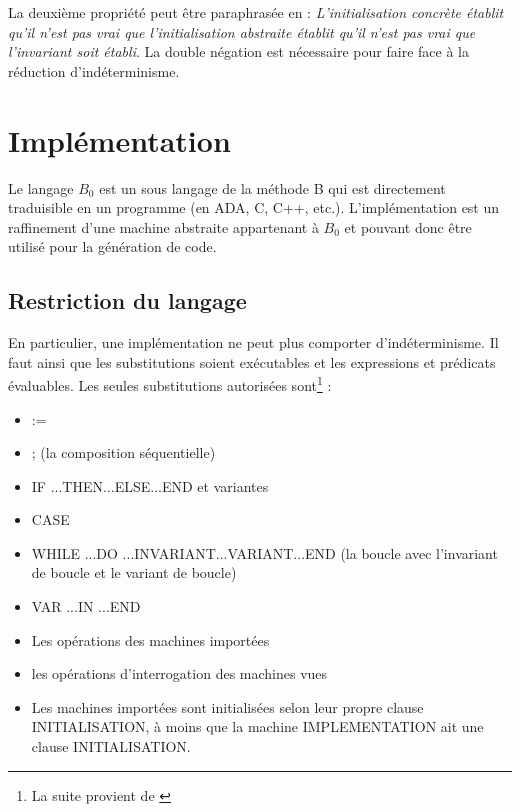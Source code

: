 \documentclass[10pt,a4paper]{article}
\begin{document}
{La deuxième propriété peut être paraphrasée en : \emph{L'initialisation concrète établit qu'il n'est pas vrai que l'initialisation abstraite établit qu'il n'est pas vrai que l'invariant soit établi}\cite{habrias2006specifications}. La double négation est nécessaire pour faire face à la réduction d'indéterminisme.
\section{Implémentation}

Le langage $B_0$ est un sous langage de la méthode B qui est directement traduisible en un programme (en ADA, C, C++, etc.).
L'implémentation est un raffinement d'une machine abstraite appartenant à $B_0$ et pouvant donc être utilisé pour la génération de code.\\

\subsection{Restriction du langage}

En particulier, une implémentation ne peut plus comporter d'indéterminisme. Il faut ainsi que les substitutions soient exécutables et les expressions et prédicats évaluables.
Les seules substitutions autorisées sont\footnote{La suite provient de \cite{habrias2006specifications}} :
\begin{itemize}
\item :=
\item ; (la composition séquentielle)
\item IF ...THEN...ELSE...END et variantes
\item CASE
\item WHILE ...DO ...INVARIANT...VARIANT...END (la boucle avec l'invariant de boucle et le variant de boucle)
\item VAR ...IN ...END
\item Les opérations des machines importées
\item les opérations d'interrogation des machines vues
\item Les machines importées sont initialisées selon leur propre clause INITIALISATION, à moins que la machine IMPLEMENTATION ait une clause INITIALISATION.
\end{itemize}

}
\end{document}
